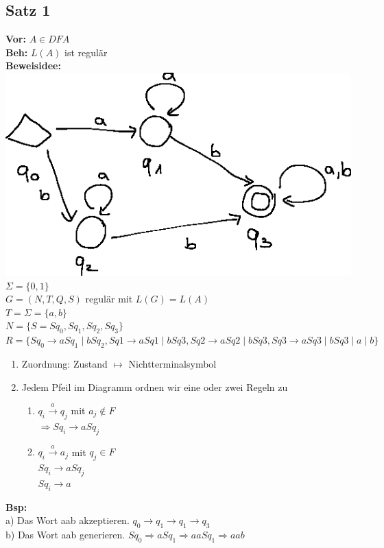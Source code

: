 \documentclass[10pt]{article}
\newcommand{\Bold}[1]{\textbf{#1}} %
\newcommand{\Oben}[2]{\overset{#1}{#2}} %
\begin{document}
\subsection{Satz 1}
\Bold{Vor:} $A\in DFA$\\
\Bold{Beh:} $L(A)$ ist regul\"ar\\
\Bold{Beweisidee:}\\
\includegraphics{Bild4.eps}\\
$\Sigma=\{0,1\}$\\
$G=(N,T,Q,S)$ regul\"ar mit $L(G)=L(A)$\\
$T=\Sigma=\{a,b\}$\\
$N=\{S=Sq_0,Sq_1,Sq_2,Sq_3\}$\\
$R=\{Sq_0\to aSq_1\mid bSq_2,Sq1\to aSq1\mid bSq3,Sq2\to aSq2\mid bSq3,Sq3\to aSq3\mid bSq3\mid a\mid b\}$
\begin{enumerate}
 \item Zuordnung: Zustand $\mapsto$ Nichtterminalsymbol
 \item Jedem Pfeil im Diagramm ordnen wir eine oder zwei Regeln zu
 \begin{enumerate}
  \item $q_i\Oben{a}{\to}q_j$ mit $a_j\notin F$\\
  $\Rightarrow Sq_i\to a Sq_j$
  \item $q_i\Oben{a}{\to}a_j$ mit $q_j\in F$\\
  $Sq_i\to a Sq_j$\\
  $Sq_i\to a$
 \end{enumerate}
\end{enumerate}
\Bold{Bsp:}\\ 
a) Das Wort aab akzeptieren. $q_0\to q_1\to q_1\to q_3$\\
b) Das Wort aab generieren. $Sq_0\Rightarrow aSq_1\Rightarrow aaSq_1\Rightarrow aab$
\end{document}
